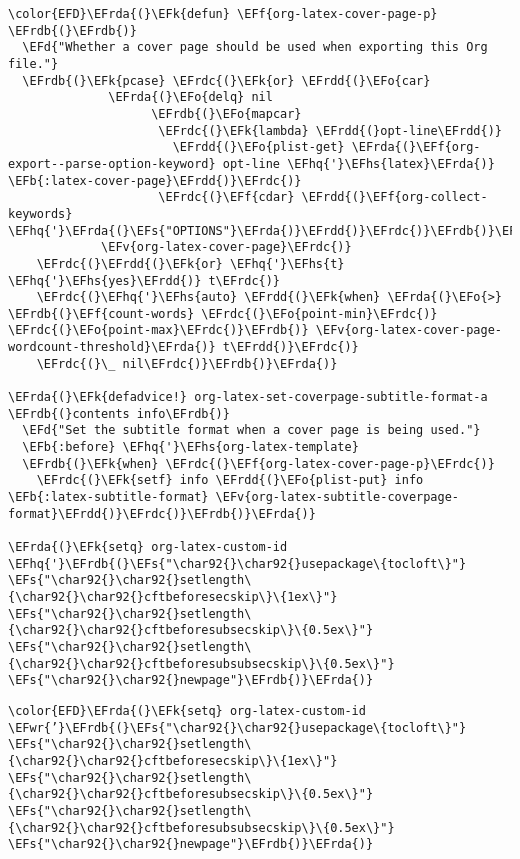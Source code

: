 \documentclass{article}
\newcommand{\EFs}[1]{\textcolor{EFs}{#1}} %
\newcommand{\EFd}[1]{\textcolor{EFd}{#1}} %
\newcommand{\EFk}[1]{\textcolor{EFk}{#1}} %
\newcommand{\EFb}[1]{\textcolor{EFb}{#1}} %
\newcommand{\EFf}[1]{\textcolor{EFf}{#1}} %
\newcommand{\EFv}[1]{\textcolor{EFv}{#1}} %
\newcommand{\EFo}[1]{\textcolor{EFo}{#1}} %
\newcommand{\EFwr}[1]{\textcolor{EFwr}{#1}} %
\newcommand{\EFhq}[1]{#1} %
\newcommand{\EFhs}[1]{\textcolor{EFhs}{#1}} %
\newcommand{\EFrda}[1]{\textcolor{EFrda}{#1}} %
\newcommand{\EFrdb}[1]{\textcolor{EFrdb}{#1}} %
\newcommand{\EFrdc}[1]{\textcolor{EFrdc}{#1}} %
\newcommand{\EFrdd}[1]{\textcolor{EFrdd}{#1}} %
\begin{document}
\begin{Code}
\begin{Verbatim}
\color{EFD}\EFrda{(}\EFk{defun} \EFf{org-latex-cover-page-p} \EFrdb{(}\EFrdb{)}
  \EFd{"Whether a cover page should be used when exporting this Org file."}
  \EFrdb{(}\EFk{pcase} \EFrdc{(}\EFk{or} \EFrdd{(}\EFo{car}
              \EFrda{(}\EFo{delq} nil
                    \EFrdb{(}\EFo{mapcar}
                     \EFrdc{(}\EFk{lambda} \EFrdd{(}opt-line\EFrdd{)}
                       \EFrdd{(}\EFo{plist-get} \EFrda{(}\EFf{org-export--parse-option-keyword} opt-line \EFhq{'}\EFhs{latex}\EFrda{)} \EFb{:latex-cover-page}\EFrdd{)}\EFrdc{)}
                     \EFrdc{(}\EFf{cdar} \EFrdd{(}\EFf{org-collect-keywords} \EFhq{'}\EFrda{(}\EFs{"OPTIONS"}\EFrda{)}\EFrdd{)}\EFrdc{)}\EFrdb{)}\EFrda{)}\EFrdd{)}
             \EFv{org-latex-cover-page}\EFrdc{)}
    \EFrdc{(}\EFrdd{(}\EFk{or} \EFhq{'}\EFhs{t} \EFhq{'}\EFhs{yes}\EFrdd{)} t\EFrdc{)}
    \EFrdc{(}\EFhq{'}\EFhs{auto} \EFrdd{(}\EFk{when} \EFrda{(}\EFo{>} \EFrdb{(}\EFf{count-words} \EFrdc{(}\EFo{point-min}\EFrdc{)} \EFrdc{(}\EFo{point-max}\EFrdc{)}\EFrdb{)} \EFv{org-latex-cover-page-wordcount-threshold}\EFrda{)} t\EFrdd{)}\EFrdc{)}
    \EFrdc{(}\_ nil\EFrdc{)}\EFrdb{)}\EFrda{)}

\EFrda{(}\EFk{defadvice!} org-latex-set-coverpage-subtitle-format-a \EFrdb{(}contents info\EFrdb{)}
  \EFd{"Set the subtitle format when a cover page is being used."}
  \EFb{:before} \EFhq{'}\EFhs{org-latex-template}
  \EFrdb{(}\EFk{when} \EFrdc{(}\EFf{org-latex-cover-page-p}\EFrdc{)}
    \EFrdc{(}\EFk{setf} info \EFrdd{(}\EFo{plist-put} info \EFb{:latex-subtitle-format} \EFv{org-latex-subtitle-coverpage-format}\EFrdd{)}\EFrdc{)}\EFrdb{)}\EFrda{)}

\EFrda{(}\EFk{setq} org-latex-custom-id \EFhq{'}\EFrdb{(}\EFs{"\char92{}\char92{}usepackage\{tocloft\}"}
\EFs{"\char92{}\char92{}setlength\{\char92{}\char92{}cftbeforesecskip\}\{1ex\}"}
\EFs{"\char92{}\char92{}setlength\{\char92{}\char92{}cftbeforesubsecskip\}\{0.5ex\}"}
\EFs{"\char92{}\char92{}setlength\{\char92{}\char92{}cftbeforesubsubsecskip\}\{0.5ex\}"}
\EFs{"\char92{}\char92{}newpage"}\EFrdb{)}\EFrda{)}
\end{Verbatim}
\end{Code}

\begin{Code}
\begin{Verbatim}
\color{EFD}\EFrda{(}\EFk{setq} org-latex-custom-id \EFwr{’}\EFrdb{(}\EFs{"\char92{}\char92{}usepackage\{tocloft\}"}
\EFs{"\char92{}\char92{}setlength\{\char92{}\char92{}cftbeforesecskip\}\{1ex\}"}
\EFs{"\char92{}\char92{}setlength\{\char92{}\char92{}cftbeforesubsecskip\}\{0.5ex\}"}
\EFs{"\char92{}\char92{}setlength\{\char92{}\char92{}cftbeforesubsubsecskip\}\{0.5ex\}"}
\EFs{"\char92{}\char92{}newpage"}\EFrdb{)}\EFrda{)}
\end{Verbatim}
\end{Code}
\end{document}
